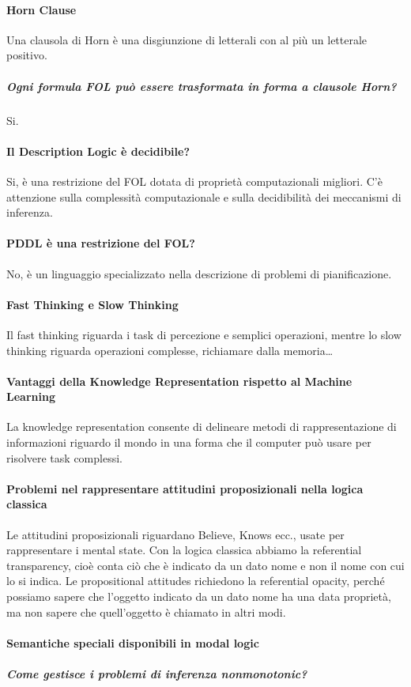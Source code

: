 \documentclass[10pt]{report}
\begin{document}
\paragraph{Horn Clause} Una clausola di Horn è una disgiunzione di letterali con al più un letterale positivo.
\subparagraph{Ogni formula FOL può essere trasformata in forma a clausole Horn?} Si.
\paragraph{Il Description Logic è decidibile?} Si, è una restrizione del FOL dotata di proprietà computazionali migliori. C'è attenzione sulla complessità computazionale e sulla decidibilità dei meccanismi di inferenza.
\paragraph{PDDL è una restrizione del FOL?} No, è un linguaggio specializzato nella descrizione di problemi di pianificazione.
\paragraph{Fast Thinking e Slow Thinking} Il fast thinking riguarda i task di percezione e semplici operazioni, mentre lo slow thinking riguarda operazioni complesse, richiamare dalla memoria\ldots
\paragraph{Vantaggi della Knowledge Representation rispetto al Machine Learning} La knowledge representation consente di delineare metodi di rappresentazione di informazioni riguardo il mondo in una forma che il computer può usare per risolvere task complessi.
\paragraph{Problemi nel rappresentare attitudini proposizionali nella logica classica} Le attitudini proposizionali riguardano Believe, Knows ecc., usate per rappresentare i mental state. Con la logica classica abbiamo la referential transparency, cioè conta ciò che è indicato da un dato nome e non il nome con cui lo si indica. Le propositional attitudes richiedono la referential opacity, perché possiamo sapere che l'oggetto indicato da un dato nome ha una data proprietà, ma non sapere che quell'oggetto è chiamato in altri modi.
\paragraph{Semantiche speciali disponibili in modal logic}
\subparagraph{Come gestisce i problemi di inferenza nonmonotonic?}
\end{document}
